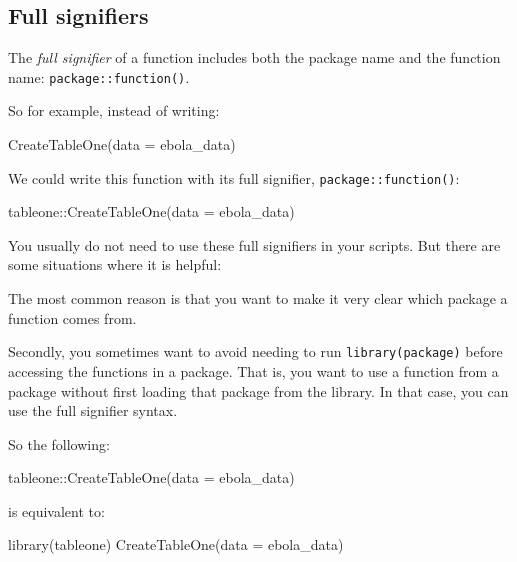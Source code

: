 \documentclass[
  letterpaper,
  DIV=11,
  numbers=noendperiod]{scrreprt}
\newenvironment{Shaded}{\begin{snugshade}}{\end{snugshade}}
\newcommand{\AttributeTok}[1]{\textcolor[rgb]{0.40,0.45,0.13}{#1}}
\newcommand{\FunctionTok}[1]{\textcolor[rgb]{0.28,0.35,0.67}{#1}}
\newcommand{\NormalTok}[1]{\textcolor[rgb]{0.00,0.23,0.31}{#1}}
\newcommand{\SpecialCharTok}[1]{\textcolor[rgb]{0.37,0.37,0.37}{#1}}
\begin{document}
\hypertarget{full-signifiers}{%
\subsection{Full signifiers}\label{full-signifiers}}

The \emph{full signifier} of a function includes both the package name
and the function name: \texttt{package::function()}.

So for example, instead of writing:

\begin{Shaded}
\begin{Highlighting}[]
\FunctionTok{CreateTableOne}\NormalTok{(}\AttributeTok{data =}\NormalTok{ ebola\_data)}
\end{Highlighting}
\end{Shaded}

We could write this function with its full signifier,
\texttt{package::function()}:

\begin{Shaded}
\begin{Highlighting}[]
\NormalTok{tableone}\SpecialCharTok{::}\FunctionTok{CreateTableOne}\NormalTok{(}\AttributeTok{data =}\NormalTok{ ebola\_data)}
\end{Highlighting}
\end{Shaded}

You usually do not need to use these full signifiers in your scripts.
But there are some situations where it is helpful:

The most common reason is that you want to make it very clear which
package a function comes from.

Secondly, you sometimes want to avoid needing to run
\texttt{library(package)} before accessing the functions in a package.
That is, you want to use a function from a package without first loading
that package from the library. In that case, you can use the full
signifier syntax.

So the following:

\begin{Shaded}
\begin{Highlighting}[]
\NormalTok{tableone}\SpecialCharTok{::}\FunctionTok{CreateTableOne}\NormalTok{(}\AttributeTok{data =}\NormalTok{ ebola\_data)}
\end{Highlighting}
\end{Shaded}

is equivalent to:

\begin{Shaded}
\begin{Highlighting}[]
\FunctionTok{library}\NormalTok{(tableone)}
\FunctionTok{CreateTableOne}\NormalTok{(}\AttributeTok{data =}\NormalTok{ ebola\_data)}
\end{Highlighting}
\end{Shaded}
\end{document}
